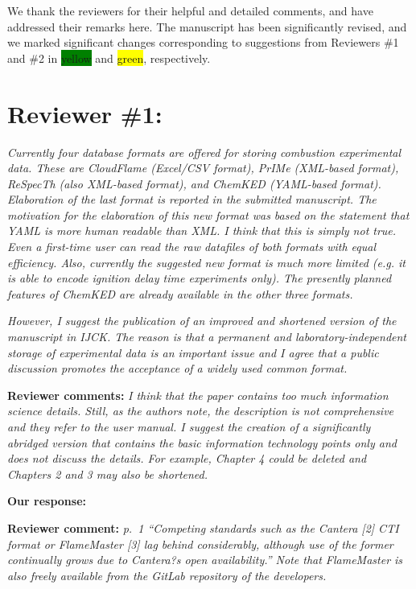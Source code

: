 \documentclass[a4paper,10pt]{elsarticle}
\providecommand{\hly}[1]{\colorbox{yellow}{#1}}
\providecommand{\hlg}[1]{\colorbox{green}{#1}}
\begin{document}
We thank the reviewers for their helpful and detailed comments, and have addressed their remarks here.
The manuscript has been significantly revised, and we marked significant changes corresponding to suggestions from Reviewers \#1 and \#2 in \hlg{yellow} and \hly{green}, respectively.


\section*{Reviewer \#1:}

\textit{Currently four database formats are offered for storing combustion experimental data. These are CloudFlame (Excel/CSV format), PrIMe (XML-based format), ReSpecTh (also XML-based format), and ChemKED (YAML-based format). Elaboration of the last format is reported in the submitted manuscript. The motivation for the elaboration of this new format was based on the statement that YAML is more human readable than XML. I think that this is simply not true. Even a first-time user can read the raw datafiles of both formats with equal efficiency. Also, currently the suggested new format is much more limited (e.g. it is able to encode ignition delay time experiments only). The presently planned features of ChemKED are already available in the other three formats.}

\textit{However, I suggest the publication of an improved and shortened version of the manuscript in IJCK. The reason is that a permanent and laboratory-independent storage of experimental data is an important issue and I agree that a public discussion promotes the acceptance of a widely used common format.}

\textbf{Reviewer comments:}
\textit{I think that the paper contains too much information science details. Still, as the authors note, the description is not comprehensive and they refer to the user manual. I suggest the creation of a significantly abridged version that contains the basic information technology points only and does not discuss the details. For example, Chapter 4 could be deleted and Chapters 2 and 3 may also be shortened.}

\textbf{Our response:}



\textbf{Reviewer comment:}
\textit{p.~1 ``Competing standards such as the Cantera [2] CTI format or FlameMaster [3] lag behind considerably, although use of the former continually grows due to Cantera?s open availability.''
Note that FlameMaster is also freely available from the GitLab repository of the developers.}
\end{document}
